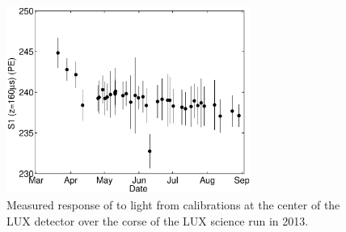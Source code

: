 \begin{figure}[h!]\centering
\includegraphics[width=80mm]{Chapter_XYZ_Corr/Thesis_Corr_Plots/s1_center_fig_2.eps}
\caption{Measured response of to light from \KrCal calibrations at the center of the LUX detector over the corse of the LUX science run in 2013.}
\label{fig:S1_center_time}
\end{figure}





